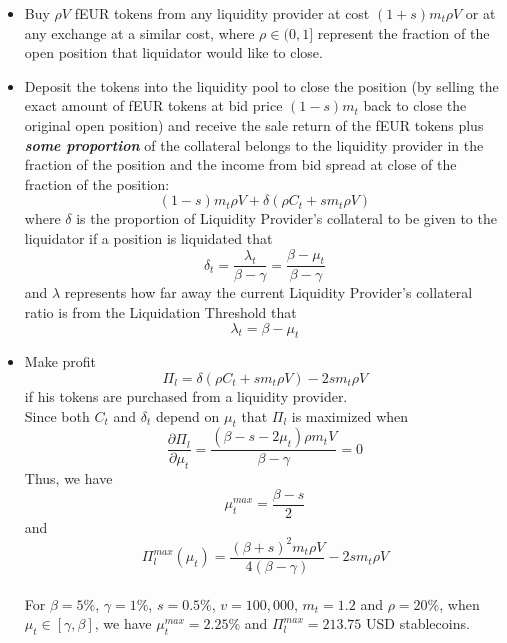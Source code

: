 \documentclass{article}
\begin{document}
\begin{itemize}

    \item Buy $\rho V$ fEUR tokens from any liquidity provider at cost $(1+s)m_t \rho V$ or at any exchange at a similar cost, where $\rho \in (0,1]$ represent the fraction of the open position that liquidator would like to close. 
    
    \item Deposit the tokens into the liquidity pool to close the position (by selling the exact amount of fEUR tokens at bid price $(1-s)m_t$ back to close the original open position) and receive the sale return of the fEUR tokens plus \textbf{\textit{some proportion}} of the collateral belongs to the liquidity provider in the fraction of the position and the income from bid spread at close of the fraction of the position:
    $$(1-s)m_t \rho V + \delta(\rho C_t + s m_t \rho V)$$
    where $\delta$ is the proportion of Liquidity Provider's collateral to be given to the liquidator if a position is liquidated that $$ \delta_t=\frac{\lambda_t}{\beta-\gamma}=\frac{\beta-\mu_t}{\beta-\gamma}$$
    and $\lambda$ represents how far away the current Liquidity Provider's collateral ratio is from the Liquidation Threshold that $$\lambda_t=\beta-\mu_t$$
    
    \begin{center}
    \end{center}

    \item Make profit 
    $$\Pi_l =\delta(\rho C_t + s m_t \rho V) -2s m_t \rho V$$ 
    if his tokens are purchased from a liquidity provider.\\
    Since both $C_t$ and $\delta_t$ depend on $\mu_t$ that $\Pi_l$ is maximized when 
    $$\frac{\partial \Pi_l}{\partial \mu_t}=\frac{(\beta - s - 2\mu_t)\rho m_t V}{\beta - \gamma}=0$$
    Thus, we have 
    $$\mu_t^{max}=\frac{\beta - s}{2}$$ and 
    $$\Pi_l^{max}(\mu_t)=\frac{(\beta + s)^2 m_t \rho V}{4(\beta - \gamma)}-2s m_t \rho V$$
    \\
    For $\beta = 5\%$, $\gamma = 1\%$, $s=0.5\%$, $v=100,000$, $m_t=1.2$ and $\rho =20\%$, when $\mu_t\in [\gamma,\beta]$, we have $\mu_t^{max}=2.25\%$ and $\Pi_l^{max}=213.75$ USD stablecoins.

\end{itemize}
\end{document}

